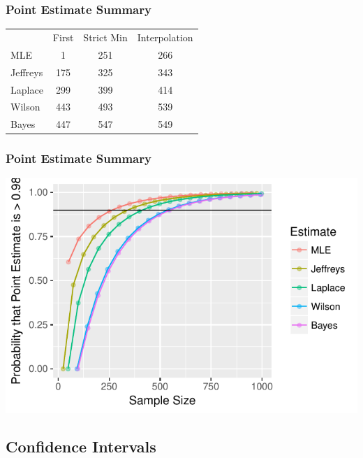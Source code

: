 \documentclass{beamer}\usepackage{knitr}
\begin{document}
\begin{frame}[fragile]
\frametitle{Point Estimate Summary}
\begin{center}
  \begin{tabular}{lccc}
              & First & Strict Min & Interpolation \\
    MLE       & 1 & 251 & 266 \\
    Jeffreys  & 175 & 325 & 343 \\
    Laplace   & 299 & 399 & 414 \\
    Wilson    & 443 & 493 & 539 \\
    Bayes     & 447 & 547 & 549 \\
  \end{tabular}
\end{center}
\end{frame}

\begin{frame}
\frametitle{Point Estimate Summary}
\begin{knitrout}
\color{fgcolor}

{\centering \includegraphics[width=\linewidth]{figure/pest_summary-1} 

}



\end{knitrout}
\end{frame}

\subsection{Confidence Intervals}
\end{document}
